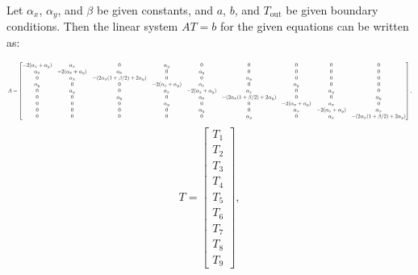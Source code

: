 \documentclass{article}
\newcommand\scalemath[2]{\scalebox{#1}{\mbox{\ensuremath{\displaystyle #2}}}}
\begin{document}
Let $\alpha_x$, $\alpha_y$, and $\beta$ be given constants, and $a$, $b$, and $T_{\text{out}}$ be given boundary conditions. Then the linear system $AT = b$ for the given equations can be written as:

\begin{equation}\scalemath{0.5}{
A = \begin{bmatrix}
	-2(\alpha_x + \alpha_y) & \alpha_x            & 0                   & \alpha_y            & 0                   & 0                   & 0                   & 0                   & 0 \\
	\alpha_x               & -2(\alpha_x + \alpha_y) & \alpha_x            & 0                   & \alpha_y            & 0                   & 0                   & 0                   & 0 \\
	0                   & \alpha_x            & -(2\alpha_x (1 + \beta/2) + 2\alpha_y) & 0                   & 0                   & \alpha_y            & 0                   & 0                   & 0 \\
	\alpha_y               & 0                   & 0                   & -2(\alpha_x + \alpha_y) & \alpha_x            & 0                   & \alpha_y            & 0                   & 0 \\
	0                   & \alpha_y            & 0                   & \alpha_x            & -2(\alpha_x + \alpha_y) & \alpha_x            & 0                   & \alpha_y            & 0 \\
	0                   & 0                   & \alpha_y            & 0                   & \alpha_x            & -(2\alpha_x (1 + \beta/2) + 2\alpha_y) & 0                   & 0                   & \alpha_y \\
	0                   & 0                   & 0                   & \alpha_y            & 0                   & 0                   & -2(\alpha_x + \alpha_y) & \alpha_x            & 0 \\
	0                   & 0                   & 0                   & 0                   & \alpha_y            & 0                   & \alpha_x            & -2(\alpha_x + \alpha_y) & \alpha_x \\
	0                   & 0                   & 0                   & 0                   & 0                   & \alpha_y            & 0                   & \alpha_x            & -(2\alpha_x (1 + \beta/2) + 2\alpha_y)
\end{bmatrix},
}
\end{equation}
\[
T = \begin{bmatrix}
	T_1 \\
	T_2 \\
	T_3 \\
	T_4 \\
	T_5 \\
	T_6 \\
	T_7 \\
	T_8 \\
	T_9
\end{bmatrix},
\]
\end{document}

